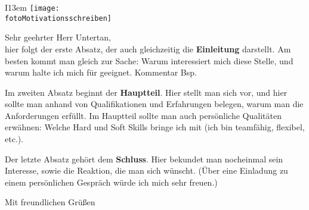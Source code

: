 
\makeatletter
\makeatother 
\emergencystretch=20pt%


\begin{letter}{}%
	\opening{}
	\begin{wrapfigure}[14]{I}{13em}
		\texttt{[image: \\fotoMotivationsschreiben]}%
	\end{wrapfigure}

	Sehr geehrter Herr Untertan,\\

	hier folgt der erste Absatz, der auch gleichzeitig die \textbf{Einleitung} darstellt. Am besten kommt man gleich zur Sache: Warum interessiert mich diese Stelle, und warum halte ich mich für geeignet.  Kommentar \glqq Bsp\grqq .

	Im zweiten Absatz beginnt der \textbf{Hauptteil}. Hier stellt man sich vor, und hier sollte man anhand von Qualifikationen und Erfahrungen belegen, warum man die Anforderungen erfüllt. Im Hauptteil sollte man auch persönliche Qualitäten erwähnen: Welche Hard und Soft Skills bringe ich mit (ich bin teamfähig, flexibel, etc.).

	Der letzte Absatz gehört dem \textbf{Schluss}. Hier bekundet man nocheinmal sein Interesse, sowie die Reaktion, die man sich wünscht. (Über eine Einladung zu einem persönlichen Gespräch würde ich mich sehr freuen.)

	Mit freundlichen Grüßen\\\sig%
	
\end{letter}
